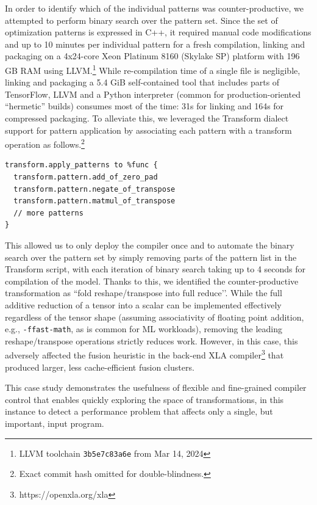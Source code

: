 \documentclass[screen,nonacm,authorversion]{acmart}
\begin{document}
In order to identify which of the individual patterns was counter-productive, we attempted to perform binary search over the pattern set. Since the set of optimization patterns is expressed in C++, it required manual code modifications and up to 10 minutes per individual pattern for a fresh compilation, linking and packaging on a 4x24-core Xeon Platinum 8160 (Skylake SP) platform with 196 GB RAM using LLVM.\footnote{LLVM toolchain \texttt{3b5e7c83a6e} from Mar 14, 2024} While re-compilation time of a single file is negligible, linking and packaging a 5.4 GiB self-contained tool that includes parts of TensorFlow, LLVM and a Python interpreter (common for production-oriented “hermetic” builds) consumes most of the time: 31s for linking and 164s for compressed packaging. To alleviate this, we leveraged the Transform dialect support for pattern application by associating each pattern with a transform operation as follows.\footnote{
Exact commit hash omitted for double-blindness.

}

\begin{lstlisting}[style=transform]
transform.apply_patterns to %func {
  transform.pattern.add_of_zero_pad
  transform.pattern.negate_of_transpose
  transform.pattern.matmul_of_transpose
  // more patterns
}
\end{lstlisting}

This allowed us to only deploy the compiler once and to automate the binary search over the pattern set by simply removing parts of the pattern list in the Transform script, with each iteration of binary search taking up to 4 seconds for compilation of the model. Thanks to this, we identified the counter-productive transformation as ``fold reshape/transpose into full reduce’’. While the full additive reduction of a tensor into a scalar can be implemented effectively regardless of the tensor shape (assuming associativity of floating point addition, e.g., \texttt{-ffast-math}, as is common for ML workloads), removing the leading reshape/transpose operations strictly reduces work. However, in this case, this adversely affected the fusion heuristic in the back-end XLA compiler\footnote{https://openxla.org/xla} that produced larger, less cache-efficient fusion clusters.



This case study demonstrates the usefulness of flexible and fine-grained compiler control that enables quickly exploring the space of transformations, in this instance to detect a performance problem that affects only a single, but important, input program.
\end{document}
